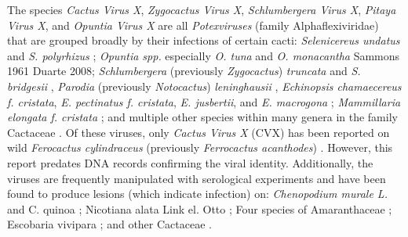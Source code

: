 \documentclass[11pt,letterpaper,titlepage]{article}
\begin{document}
\begin{linenumbers}

The species \textit{Cactus Virus X}, \textit{Zygocactus Virus X}, \textit{Schlumbergera Virus X}, \textit{Pitaya Virus X}, and \textit{Opuntia Virus X} are all \textit{Potexviruses} (family Alphaflexiviridae) that are grouped broadly by their infections of certain cacti: \textit{Selenicereus undatus} and \textit{S. polyrhizus} \citep{li_viral_2015,peng_molecular_2016}; \textit{Opuntia spp.} especially \textit{O. tuna} \citep{koenig_molecular_2004, duarte_Potexvirus_2008} and \textit{O. monacantha} \citep{attathom_occurrence_1978} Sammons 1961 Duarte 2008; \textit{Schlumbergera} (previously \textit{Zygocactus}) \textit{truncata} and \textit{S. bridgesii} \citep{duarte_Potexvirus_2008, koenig_molecular_2004}, \textit{Parodia }(previously \textit{Notocactus}) \textit{leninghausii} \citep{park_detection_2018}, \textit{Echinopsis chamaecereus f. cristata}, \textit{E. pectinatus f. cristata}, \textit{E. jusbertii}, and \textit{E. macrogona} \citep{maliarenko_cactus_2013}; \textit{Mammillaria elongata f. cristata} \citep{maliarenko_cactus_2013}; and multiple other species within many genera in the family Cactaceae \citep{evallo_brief_2021}. Of these viruses, only \textit{Cactus Virus X} (CVX) has been reported on wild \textit{Ferocactus cylindraceus} (previously \textit{Ferrocactus acanthodes}) \citep{attathom_occurrence_1978}. 
However, this report predates DNA records confirming the viral identity.
Additionally, the viruses are frequently manipulated with serological experiments and have been found to produce lesions (which indicate infection) on: \textit{Chenopodium murale L.} \citep{maliarenko_cactus_2013} and C. quinoa \citep{attathom_identification_1978,attathom_occurrence_1978, brandes_untersuchungen_1963-1}; Nicotiana alata Link el. Otto \citep{maliarenko_cactus_2013}; Four species of Amaranthaceae \citep{attathom_identification_1978}; Escobaria vivipara \citep{attathom_identification_1978}; and other Cactaceae \citep{attathom_identification_1978}.


\end{linenumbers}
\end{document}
